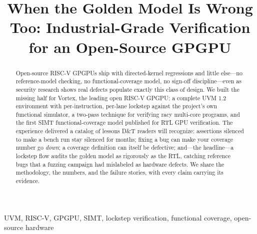 \documentclass[conference]{IEEEtran}
\begin{document}
\title{When the Golden Model Is Wrong Too: Industrial-Grade
	Verification for an Open-Source GPGPU}

\author{
	}

\maketitle

\begin{abstract}
	Open-source RISC-V GPGPUs ship with directed-kernel regressions and
	little else---no reference-model checking, no functional-coverage
	model, no sign-off discipline---even as security research shows real
	defects populate exactly this class of design. We built the missing
	half for Vortex, the leading open RISC-V GPGPU: a complete UVM 1.2
	environment with per-instruction, per-lane lockstep against the
	project's own functional simulator, a two-pass technique for verifying
	racy multi-core programs, and the first SIMT functional-coverage model
	published for RTL GPU verification. The experience delivered a
	catalog of lessons D\&T readers will recognize: assertions silenced
	to make a bench run stay silenced for months; fixing a bug can make
	your coverage number go \emph{down}; a coverage definition can itself
	be defective; and---the headline---a lockstep flow audits the golden
	model as rigorously as the RTL, catching reference bugs that a
	fuzzing campaign had mislabeled as hardware defects. We share the
	methodology, the numbers, and the failure stories, with every claim
	carrying its evidence.
\end{abstract}

\begin{IEEEkeywords}
	UVM, RISC-V, GPGPU, SIMT, lockstep verification, functional coverage,
	open-source hardware
\end{IEEEkeywords}
\end{document}
